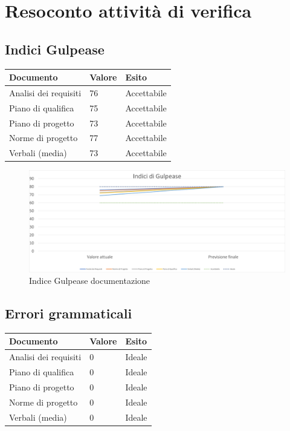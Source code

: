 \chapter{Resoconto attività di verifica}\label{resoconto-attivita-di-verifica}

\section{Indici Gulpease}

\begin{center}
    \begin{xltabular}{\linewidth}{|l|l|l|}
    \hline
    \textbf{Documento} & \textbf{Valore} & \textbf{Esito} \\
    \hline
     Analisi dei requisiti & 76 & Accettabile \\
     Piano di qualifica & 75 & Accettabile \\
     Piano di progetto & 73 & Accettabile \\
     Norme di progetto & 77 & Accettabile \\
     Verbali (media) & 73 & Accettabile \\ 
    \hline

    \end{xltabular}
\end{center}

\begin{figure}
    \includegraphics[width=\linewidth]{contenuti/img/gulpease.png}
    \caption{Indice Gulpease documentazione}
  \end{figure}

\section{Errori grammaticali}

\begin{center}
    \begin{xltabular}{\linewidth}{|l|l|l|}
    \hline
    \textbf{Documento} & \textbf{Valore} & \textbf{Esito} \\
    \hline
     Analisi dei requisiti & 0 & Ideale \\
     Piano di qualifica & 0 & Ideale \\
     Piano di progetto & 0 & Ideale \\
     Norme di progetto & 0 & Ideale \\
     Verbali (media) & 0 & Ideale \\ 
    \hline

    \end{xltabular}
\end{center}
